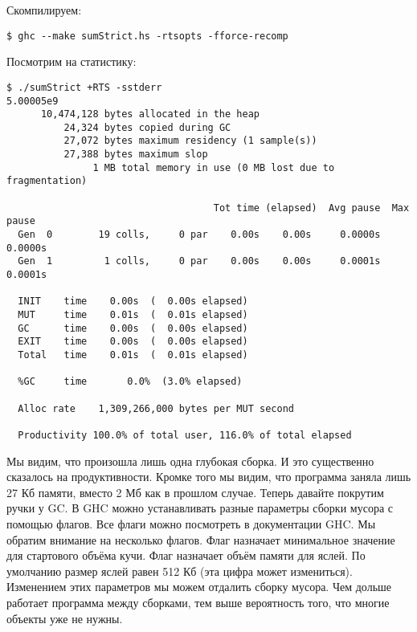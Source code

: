 
Скомпилируем:


\begin{verbatim}
$ ghc --make sumStrict.hs -rtsopts -fforce-recomp
\end{verbatim}

Посмотрим на статистику:


\begin{verbatim}
$ ./sumStrict +RTS -sstderr
5.00005e9
      10,474,128 bytes allocated in the heap
          24,324 bytes copied during GC
          27,072 bytes maximum residency (1 sample(s))
          27,388 bytes maximum slop
               1 MB total memory in use (0 MB lost due to fragmentation)

                                    Tot time (elapsed)  Avg pause  Max pause
  Gen  0        19 colls,     0 par    0.00s    0.00s     0.0000s    0.0000s
  Gen  1         1 colls,     0 par    0.00s    0.00s     0.0001s    0.0001s

  INIT    time    0.00s  (  0.00s elapsed)
  MUT     time    0.01s  (  0.01s elapsed)
  GC      time    0.00s  (  0.00s elapsed)
  EXIT    time    0.00s  (  0.00s elapsed)
  Total   time    0.01s  (  0.01s elapsed)

  %GC     time       0.0%  (3.0% elapsed)

  Alloc rate    1,309,266,000 bytes per MUT second

  Productivity 100.0% of total user, 116.0% of total elapsed
\end{verbatim}

Мы видим, что произошла лишь одна глубокая сборка. И это существенно
сказалось на продуктивности. Кромке того мы видим, что программа заняла
лишь 27 Кб памяти, вместо 2 Мб как в прошлом случае. Теперь давайте
покрутим ручки у GC. В GHC можно устанавливать разные параметры сборки
мусора с помощью флагов. Все флаги можно посмотреть в документации GHC.
Мы обратим внимание на несколько флагов. Флаг  назначает
минимальное значение для стартового объёма кучи. Флаг  назначает
объём памяти для яслей. По умолчанию размер яслей равен 512 Кб (эта
цифра может измениться). Изменением этих параметров мы можем отдалить
сборку мусора. Чем дольше работает программа между сборками, тем выше
вероятность того, что многие объекты уже не нужны.

